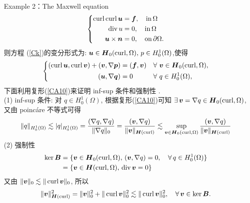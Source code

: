 Example 2：The Maxwell equation
\begin{equation}\label{Ck}
\left\{
\begin{aligned}
\operatorname{curl}\operatorname{curl} \boldsymbol{u} &=\boldsymbol{f},\quad \mathrm{in}\,\Omega \\
\operatorname{div} u &=0, \quad \mathrm{in}\,\Omega \\
\boldsymbol{u}\times \boldsymbol{n}&=0,\quad \mathrm{on}\,\partial\Omega .
\end{aligned}\right.
\end{equation}
则方程 (\ref{Ck})的变分形式为: $\boldsymbol{u}\in\boldsymbol{H}_0(\operatorname{curl}, \Omega),\,p\in H_0^{1}(\Omega)$,使得
\begin{equation}\label{Cr}
\left\{
\begin{aligned}
(\operatorname{curl}\boldsymbol{u},\operatorname{curl}\boldsymbol{v})+(\boldsymbol{v},\nabla\boldsymbol{p})&=(\boldsymbol{f},\boldsymbol{v})
  &&\forall \,\, \boldsymbol{v}\in \boldsymbol{H}_0(\operatorname{curl}, \Omega),
 \\
 ( \boldsymbol{u},\nabla\boldsymbol{q}) &=0 &&\forall \,\, q\in H_0^{1}(\Omega),
\end{aligned}\right.
\end{equation}
下面利用复形(\ref{CA10})来证明 inf-sup 条件和强制性 .\\
(1) inf-sup 条件: 对 $q\in H_0^{1}(\Omega)$, 根据复形(\ref{CA10})可知 $ \exists\,\boldsymbol{v}=\nabla q\in \boldsymbol{H}_0(\operatorname{curl}, \Omega)$,
又由 poinc\'{a}re 不等式可得
\begin{align*}
\|q\|_{ H_0^{1}(\Omega)}\lesssim |q|_{ H_0^{1}(\Omega)}=\frac{(\nabla q,\nabla q)}{\|\nabla q\|_{0}}
=\frac{(\boldsymbol{v},\nabla q)}{\|\boldsymbol{v}\|_{\boldsymbol{H}(\operatorname{curl})}}\lesssim\sup_{\boldsymbol{v}\in\boldsymbol{H}_0(\operatorname{curl}, \Omega)}\frac{(\boldsymbol{v},\nabla q)}{\|\boldsymbol{v}\|_{\boldsymbol{H}(\operatorname{curl})}}
\end{align*}
(2) 强制性
\begin{align*}
\ker \boldsymbol{B}
&=\{\boldsymbol{v}\in \boldsymbol{H}_0(\operatorname{curl}, \Omega),\,(\boldsymbol{v},\nabla q)=0,\quad\forall \, q\in H_0^{1}(\Omega)\}\\
&=\{\boldsymbol{v}\in \boldsymbol{H}(\operatorname{curl}, \Omega),\,\operatorname{div}\boldsymbol{v}=0\}
\end{align*}
又由 $\|\boldsymbol{v}\|_{0}\lesssim\|\operatorname{curl}\boldsymbol{v}\|_{0}$,
所以
\begin{align*}
\|\boldsymbol{v}\|_{\boldsymbol{H}(\operatorname{curl})}^2=\|\boldsymbol{v}\|_{0}^2+\|\operatorname{curl}\boldsymbol{v}\|_{0}^2
\lesssim\|\operatorname{curl}\boldsymbol{v}\|_{0}^2,\quad\forall \,\boldsymbol{v}\in \ker \boldsymbol{B}.
\end{align*}

